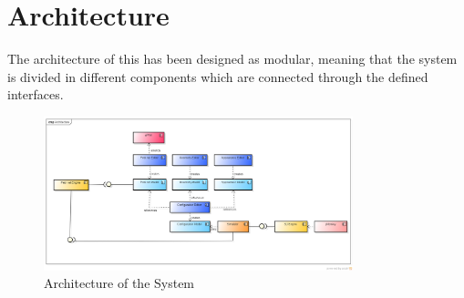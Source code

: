 \section{Architecture}
The architecture of this \epns has been designed as modular, meaning that the system is divided in different components which are connected through the defined interfaces.

\begin{figure}[htp]
\begin{center}
  \includegraphics[width=0.8\textwidth]{image/cd-architecture.png}
  \caption{Architecture of the System}
  \label{fig:architecture}
\end{center}
\end{figure}









